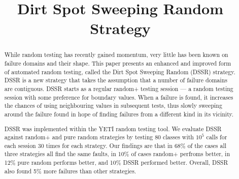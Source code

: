 \documentclass[conference]{IEEEtran}
\begin{document}
\title{Dirt Spot Sweeping Random Strategy}
\author{

\and
{}
}

\maketitle

\begin{abstract}
While random testing has recently gained momentum, very little has been known on failure domains and their shape. 
This paper presents an enhanced and improved form of automated random testing, called the Dirt Spot Sweeping Random (DSSR) strategy. DSSR is a new strategy that takes the assumption that a number of failure domains are contiguous.
DSSR starts as a regular random+ testing session --- a random testing session with some preference for boundary values. 
When a failure is found, it increases the chances of using neighbouring values in subsequent tests, thus slowly sweeping around the failure found in hope of finding failures from a different kind in its vicinity.

DSSR was implemented within the YETI random testing tool. We evaluate DSSR against random+ and pure random strategies by testing 80 classes with $10^5$ calls for each session 30 times for each strategy.
Our findings are that in 68\% of the cases all three strategies all find the same faults, in 10\% of cases random+ perfroms better, in 12\% pure random performs better, and 10\% DSSR performed better.
Overall, DSSR also found 5\% more failures than other strategies.
\end{abstract}
\IEEEpeerreviewmaketitle

%
\end{document}
